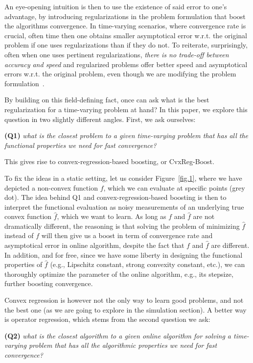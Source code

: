 \documentclass{article}
\begin{document}
An eye-opening intuition is then to use the existence of said error to one's advantage, by introducing regularizations in the problem formulation that boost the algorithms convergence. In time-varying scenarios, where convergence rate is crucial, often time then one obtains smaller asymptotical error w.r.t. the original problem if one uses regularizations than if they do not. To reiterate, surprisingly, often when one uses pertinent regularizations, \emph{there is no trade-off between accuracy and speed} and regularized problems offer better speed and asymptotical errors w.r.t. the original problem, even though we are modifying the problem formulation~\cite{Simonetto2014d, Bastianello2020asi}.  

By building on this field-defining fact, once can ask what is the best regularization for a time-varying problem at hand? In this paper, we explore this question in two slightly different angles. First, we ask ourselves: 

{\bf (Q1) } \emph{what is the closest problem to a given time-varying problem that has all the functional properties we need for fast convergence?}

This gives rise to convex-regression-based boosting, or CvxReg-Boost. 
 
To fix the ideas in a static setting, let us consider Figure~\ref{fig.1}, where we have depicted a non-convex function $f$, which we can evaluate at specific points (grey dot). The idea behind Q1 and convex-regression-based boosting is then to interpret the functional evaluation as noisy measurements of an underlying true convex function $\hat{f}$, which we want to learn. As long as $f$ and $\hat{f}$ are not dramatically different, the reasoning is that solving the problem of minimizing $\hat{f}$ instead of $f$ will then give us a boost in term of convergence rate and asymptotical error in online algorithm, despite the fact that $f$ and $\hat{f}$ are different. In addition, and for free, since we have some liberty in designing the functional properties of $\hat{f}$ (e.g., Lipschitz constant, strong convexity constant, etc.), we can thoroughly optimize the parameter of the online algorithm, e.g., its stepsize, further boosting convergence.  

Convex regression is however not the only way to learn good problems, and not the best one (as we are going to explore in the simulation section). A better way is operator regression, which stems from the second question we ask: 

{\bf (Q2) } \emph{what is the closest algorithm to a given online algorithm for solving a time-varying problem that has all the algorithmic properties we need for fast convergence?  
}
\end{document}
